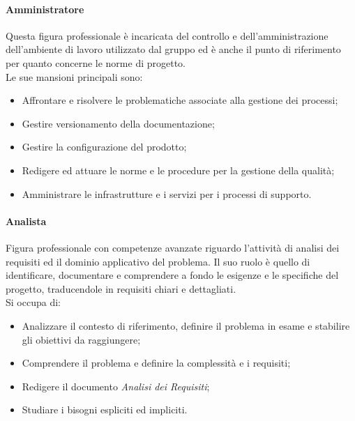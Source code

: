 \paragraph{Amministratore}\label{amministratore}Questa figura professionale è incaricata del controllo e dell'amministrazione dell'ambiente di lavoro utilizzato dal gruppo ed è anche il punto di riferimento per quanto concerne le norme di progetto. \\
Le sue mansioni principali sono:
\begin{itemize}
    \item Affrontare e risolvere le problematiche associate alla gestione dei processi;
    \item Gestire versionamento della documentazione;
    \item Gestire la configurazione del prodotto;
    \item Redigere ed attuare le norme e le procedure per la gestione della qualità;
    \item Amministrare le infrastrutture e i servizi per i processi di supporto.
\end{itemize}

\paragraph{Analista}\label{analista}Figura professionale con competenze avanzate riguardo l'attività di analisi dei requisiti ed il dominio applicativo del problema. Il suo ruolo è quello di identificare, documentare e comprendere a fondo le esigenze e le specifiche del progetto, traducendole in requisiti chiari e dettagliati. \\
Si occupa di:
\begin{itemize}
    \item Analizzare il contesto di riferimento, definire il problema in esame e stabilire gli obiettivi da raggiungere;
    \item Comprendere il problema e definire la complessità e i requisiti;
    \item Redigere il documento \textit{Analisi dei Requisiti};
    \item Studiare i bisogni espliciti ed impliciti.
\end{itemize}

